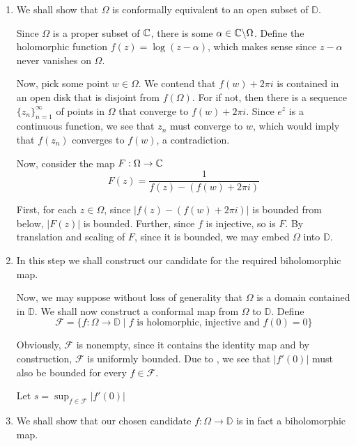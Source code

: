 \begin{enumerate}[label=\bfseries Step \Roman*.]
\item We shall show that $\Omega$ is conformally equivalent to an open subset of $\mathbb D$.

Since $\Omega$ is a proper subset of $\mathbb{C}$, there is some $\alpha\in\mathbb{C}\backslash\Omega$. Define the holomorphic function $f(z) = \log(z - \alpha)$, which makes sense since $z - \alpha$ never vanishes on $\Omega$.

Now, pick some point $w\in\Omega$. We contend that $f(w) + 2\pi i$ is contained in an open disk that is disjoint from $f(\Omega)$. For if not, then there is a sequence $\{z_n\}_{n = 1}^\infty$ of points in $\Omega$ that converge to $f(w) + 2\pi i$. Since $e^z$ is a continuous function, we see that $z_n$ must converge to $w$, which would imply that $f(z_n)$ converges to $f(w)$, a contradiction.

Now, consider the map $F:\Omega\to\mathbb{C}$
\begin{equation*}
    F(z) = \frac{1}{f(z) - (f(w) + 2\pi i)}
\end{equation*}

First, for each $z\in\Omega$, since $|f(z) - (f(w) + 2\pi i)|$ is bounded from below, $|F(z)|$ is bounded. Further, since $f$ is injective, so is $F$. By translation and scaling of $F$, since it is bounded, we may embed $\Omega$ into $\mathbb D$.

\item  In this step we shall construct our candidate for the required biholomorphic map.

Now, we may suppose without loss of generality that $\Omega$ is a domain contained in $\mathbb D$. We shall now construct a conformal map from $\Omega$ to $\mathbb D$. Define 
\begin{equation*}
    \mathcal F = \{f: \Omega\to\mathbb D\mid f\text{ is holomorphic, injective and }f(0) = 0\}
\end{equation*}

Obviously, $\mathcal F$ is nonempty, since it contains the identity map and by construction, $\mathcal F$ is uniformly bounded. Due to , we see that $|f'(0)|$ must also be bounded for every $f\in\mathcal F$.

Let $s = \displaystyle\sup_{f\in\mathcal F}|f'(0)|$

\item We shall show that our chosen candidate $f:\Omega\to\mathbb D$ is in fact a biholomorphic map.


\end{enumerate}
